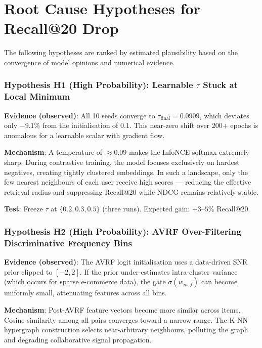 \documentclass[12pt,a4paper]{article}
\begin{document}
\section{Root Cause Hypotheses for Recall@20 Drop}

The following hypotheses are ranked by estimated plausibility based on
the convergence of model opinions and numerical evidence.

\subsubsection*{Hypothesis H1 (High Probability): Learnable $\tau$ Stuck
at Local Minimum}

\textbf{Evidence (observed)}: All 10 seeds converge to
$\tau_{\text{final}} = 0.0909$, which deviates only $-9.1\%$ from the
initialisation of $0.1$.  This near-zero shift over 200+ epochs is
anomalous for a learnable scalar with gradient flow.

\textbf{Mechanism}: A temperature of $\approx 0.09$ makes the InfoNCE
softmax extremely sharp.  During contrastive training, the model focuses
exclusively on hardest negatives, creating tightly clustered embeddings.
In such a landscape, only the few nearest neighbours of each user
receive high scores --- reducing the effective retrieval radius and
suppressing Recall@20 while NDCG remains relatively stable.

\textbf{Test}: Freeze $\tau$ at $\{0.2, 0.3, 0.5\}$ (three runs).
Expected gain: $+3$--$5\%$ Recall@20.

\subsubsection*{Hypothesis H2 (High Probability): AVRF Over-Filtering
Discriminative Frequency Bins}

\textbf{Evidence (observed)}: The AVRF logit initialisation uses a
data-driven SNR prior clipped to $[-2, 2]$.  If the prior
under-estimates intra-cluster variance (which occurs for sparse
e-commerce data), the gate $\sigma(w_{m,f})$ can become uniformly
small, attenuating features across all bins.

\textbf{Mechanism}: Post-AVRF feature vectors become more similar across
items.  Cosine similarity among all pairs converges toward a narrow
range.  The K-NN hypergraph construction selects near-arbitrary
neighbours, polluting the graph and degrading collaborative signal
propagation.
\end{document}
